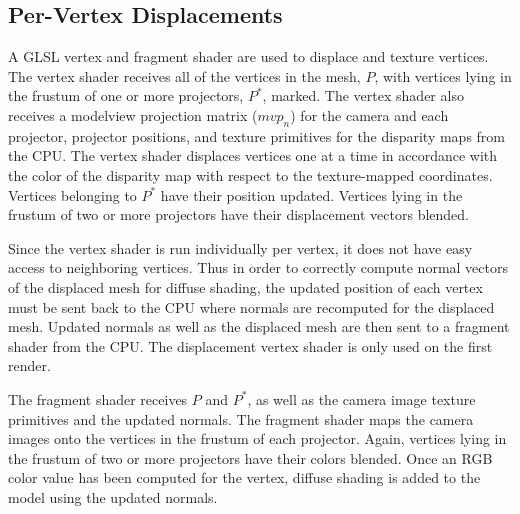 \documentclass{llncs}
\begin{document}
\subsection{Per-Vertex Displacements}
\label{subsec:displacements}
\noindent A GLSL vertex and fragment shader are used to displace and texture vertices. The vertex shader receives all of the vertices in the mesh, $P$, with vertices lying in the frustum of one or more projectors, $P^*$, marked. The vertex shader also receives a modelview projection matrix ($mvp_n$) for the camera and each projector, projector positions, and texture primitives for the disparity maps from the CPU. The vertex shader displaces vertices one at a time in accordance with the color of the disparity map with respect to the texture-mapped coordinates. Vertices belonging to $P^{*}$ have their position updated. Vertices lying in the frustum of two or more projectors have their displacement vectors blended.

Since the vertex shader is run individually per vertex, it does not have easy access to neighboring vertices. Thus in order to correctly compute normal vectors of the displaced mesh for diffuse shading, the updated position of each vertex must be sent back to the CPU where normals are recomputed for the displaced mesh. Updated normals as well as the displaced mesh are then sent to a fragment shader from the CPU. The displacement vertex shader is only used on the first render.

The fragment shader receives $P$ and $P^{*}$, as well as the camera image texture primitives and the updated normals. The fragment shader maps the camera images onto the vertices in the frustum of each projector. Again, vertices lying in the frustum of two or more projectors have their colors blended. Once an RGB color value has been computed for the vertex, diffuse shading is added to the model using the updated normals.
\end{document}
